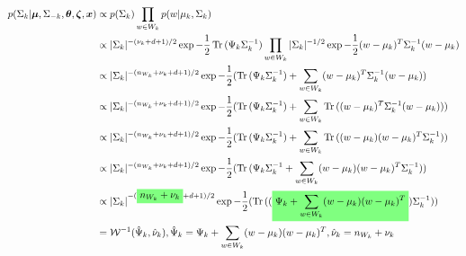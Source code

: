 \documentclass[12pt]{article}
\newcommand{\ghighlight}[1]{%
  \colorbox{green!50}{$\displaystyle#1$}}
\DeclareMathOperator{\Tr}{Tr}
\begin{document}
\begin{equation*}
\begin{split}
p(\Sigma_k | \bm{\mu}, \Sigma_{-k}, \bm{\theta}, \bm{\zeta}, \bm{x}) & \propto p(\Sigma_k) \prod_{w \in W_k} p(w | \mu_k, \Sigma_k) \\
& \propto |\Sigma_k|^{-(\nu_k + d + 1)/2} \exp{-\frac{1}{2} \Tr{(\Psi_k\Sigma_k^{-1})}}\prod_{w \in W_k} |\Sigma_k|^{-1/2} \exp{-\frac{1}{2}(w - \mu_k)^T\Sigma_k^{-1}(w - \mu_k)} \\
& \propto |\Sigma_k|^{-(n_{W_k} + \nu_k + d + 1)/2} \exp{-\frac{1}{2} (\Tr{(\Psi_k\Sigma_k^{-1})} + \sum_{w \in W_k} (w - \mu_k)^T\Sigma_k^{-1}(w - \mu_k))} \\
& \propto |\Sigma_k|^{-(n_{W_k} + \nu_k + d + 1)/2} \exp{-\frac{1}{2} (\Tr{(\Psi_k\Sigma_k^{-1})} + \sum_{w \in W_k} \Tr{((w - \mu_k)^T\Sigma_k^{-1}(w - \mu_k))})} \\
& \propto |\Sigma_k|^{-(n_{W_k} + \nu_k + d + 1)/2} \exp{-\frac{1}{2} (\Tr{(\Psi_k\Sigma_k^{-1})} + \sum_{w \in W_k} \Tr{((w - \mu_k)(w - \mu_k)^T\Sigma_k^{-1})})} \\
& \propto |\Sigma_k|^{-(n_{W_k} + \nu_k + d + 1)/2} \exp{-\frac{1}{2} (\Tr{(\Psi_k\Sigma_k^{-1} + \sum_{w \in W_k} (w - \mu_k)(w - \mu_k)^T\Sigma_k^{-1})})} \\
& \propto |\Sigma_k|^{-(\ghighlight{n_{W_k} + \nu_k} + d + 1)/2} \exp{-\frac{1}{2} (\Tr{((\ghighlight{\Psi_k + \sum_{w \in W_k} (w - \mu_k)(w - \mu_k)^T})\Sigma_k^{-1})})} \\
& = \mathcal{W}^{-1}(\hat{\Psi}_k, \hat{\nu}_k), \hat{\Psi}_k = \Psi_k + \sum_{w \in W_k} (w - \mu_k)(w - \mu_k)^T, \hat{\nu}_k = n_{W_k} + \nu_k 
\end{split}
\end{equation*}
\end{document}
